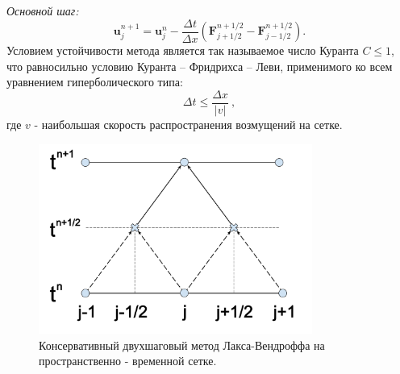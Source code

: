 \documentclass[a4paper]{article}
\begin{document}
	\textit{Основной шаг:}
	\begin{equation}
		\mathbf{u}_{j}^{n+1} = \mathbf{u}_{j}^{n} - \frac{\Delta t}{\Delta x} \left(
		\mathbf{F}_{j+1/2}^{n+1/2} - \mathbf{F}_{j-1/2}^{n+1/2}				 \right) .
	\end{equation}
	Условием устойчивости метода является так называемое число Куранта $C \leqslant 1$, что равносильно условию Куранта -- Фридрихса -- Леви, применимого ко всем уравнением гиперболического типа: %
	\begin{equation}
		\Delta t \leqslant \dfrac{\Delta x}{|v|} \:,
	\end{equation}
	где $v$ - наибольшая скорость распространения возмущений на сетке.
	\begin{figure}
		\centering
		\includegraphics[width=0.8\textwidth]{Lax-Wendroff.pdf}
		\caption{Консервативный двухшаговый метод Лакса-Вендроффа на пространственно - временной сетке.}
		\label{graph_t}
	\end{figure}
\end{document}
